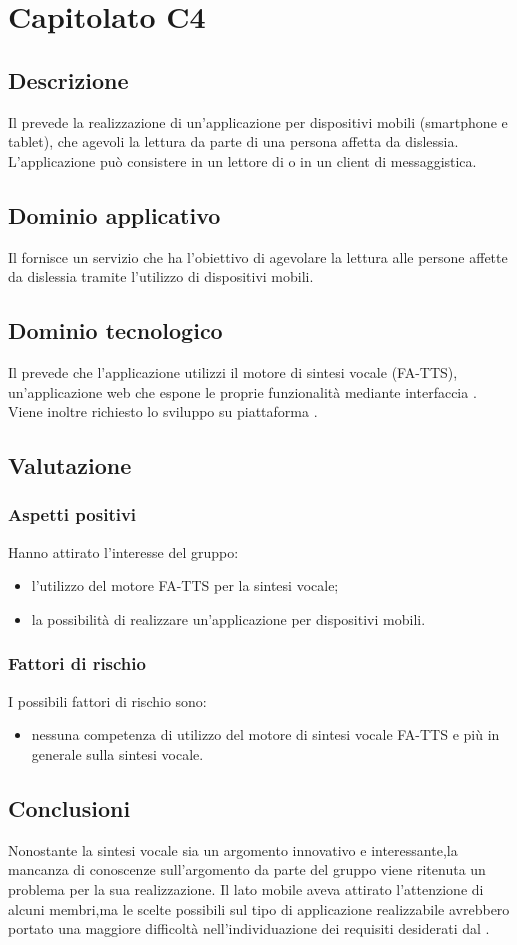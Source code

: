 \section {Capitolato C4}
	\subsection {Descrizione}
	Il  prevede la realizzazione di un'applicazione per dispositivi mobili (smartphone e tablet), che agevoli la
lettura da parte di una persona affetta da dislessia.  L'applicazione può consistere in un lettore di  o in un
client di messaggistica.
	\subsection {Dominio applicativo}
	Il  fornisce un servizio che ha l'obiettivo di agevolare la lettura alle persone affette da dislessia tramite l'utilizzo di dispositivi mobili. 
	\subsection {Dominio tecnologico}
Il  prevede che l'applicazione utilizzi il motore di sintesi vocale  (FA-TTS), un'applicazione web che
espone le proprie funzionalità mediante interfaccia . Viene inoltre richiesto lo sviluppo su piattaforma .
	\subsection {Valutazione}
			\subsubsection {Aspetti positivi}
			Hanno attirato l'interesse del gruppo:
				\begin {itemize}
				  \item l'utilizzo del motore FA-TTS per la sintesi vocale;
				  \item la possibilità di realizzare un'applicazione per dispositivi mobili.		
				\end {itemize}
			\subsubsection {Fattori di rischio}
			I possibili fattori di rischio sono:
				\begin {itemize}
					\item nessuna competenza di utilizzo del motore di sintesi vocale FA-TTS e più in generale sulla sintesi vocale.
				\end {itemize}
	\subsection {Conclusioni}
		Nonostante la sintesi vocale sia un argomento innovativo e interessante,la mancanza di conoscenze sull'argomento da parte del gruppo viene ritenuta un problema per la sua realizzazione. Il lato mobile aveva attirato l'attenzione di alcuni membri,ma le scelte possibili sul tipo di applicazione realizzabile avrebbero portato una maggiore difficoltà nell'individuazione dei requisiti desiderati dal .